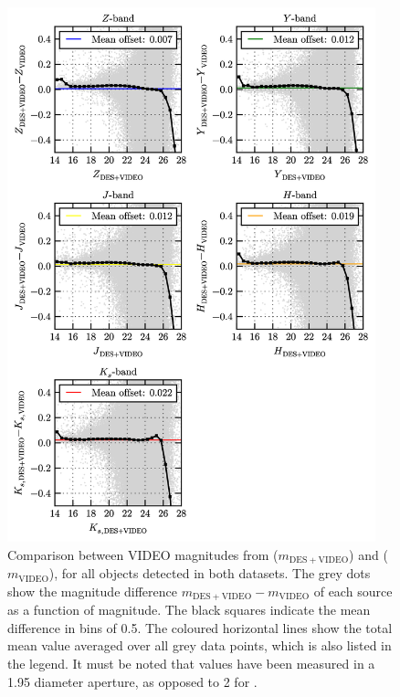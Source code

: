 \begin{figure}[ph] 
\centering    
\includegraphics[width=0.95\textwidth]{mag_comparison.png}
\caption[Verification of the photometry]{Comparison between VIDEO magnitudes from \DESVIDEO ($m_{\mathrm{DES+VIDEO}}$) and \cite{2013MNRAS.428.1281J} ($m_{\mathrm{VIDEO}}$), for all objects detected in both datasets. The grey dots show the magnitude difference $m_{\mathrm{DES+VIDEO}}-m_{\mathrm{VIDEO}}$ of each source as a function of \DESVIDEO magnitude. The black squares indicate the mean difference in bins of \SI{0.5}{\mag}. The coloured horizontal lines show the total mean value averaged over all grey data points, which is also listed in the legend. It must be noted that \DESVIDEO values have been measured in a \SI{1.95}{\arcsec} diameter aperture, as opposed to \SI{2}{\arcsec} for \cite{2013MNRAS.428.1281J}.}
\label{fig:mag_comparison}
\end{figure}


